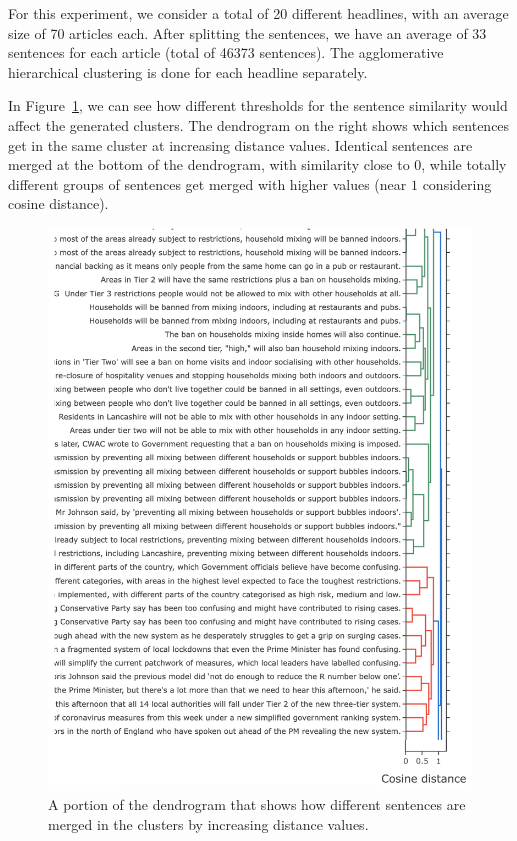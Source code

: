 For this experiment, we consider a total of 20 different headlines, with an average size of 70 articles each.
After splitting the sentences, we have an average of 33 sentences for each article (total of 46373 sentences).
The agglomerative hierarchical clustering is done for each headline separately.

In Figure~\ref{fig:dendrogram}, we can see how different thresholds for the sentence similarity would affect the generated clusters. The dendrogram on the right shows which sentences get in the same cluster at increasing distance values. Identical sentences are merged at the bottom of the dendrogram, with similarity close to $0$, while totally different groups of sentences get merged with higher values (near $1$ considering cosine distance).
\begin{figure}[!htb]
    \centering
    \includegraphics[width=\linewidth]{figures/dendrogram_high_legend.png}
    \caption{A portion of the dendrogram that shows how different sentences are merged in the clusters by increasing distance values.}
    \label{fig:dendrogram}
\end{figure}

